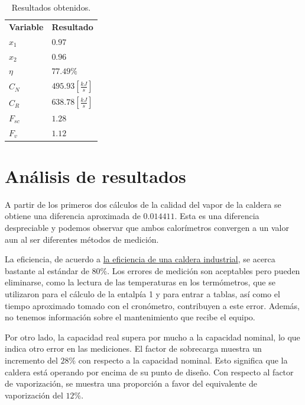 \documentclass[12pt,letterpaper]{article}
\begin{document}
\begin{table}[H] \label{tab:results}
\centering
\renewcommand{\arraystretch}{1.4}
    \begin{tabular}{|l|l|}
    \hline
    \textbf{Variable} & \textbf{Resultado} \\
    $x_1$ & $0.97$ \\
    \hline
    $x_2$ & $0.96$ \\
    \hline
    $\eta$ & $77.49\%$ \\
    \hline
    $C_N$ & $495.93\left[\frac{kJ}{s}\right]$ \\
    \hline
    $C_R$ & $638.78\left[\frac{kJ}{s}\right]$ \\
    \hline
    $F_{sc}$ & $1.28$ \\
    \hline
    $F_{v}$ & $1.12$ \\
    \hline
    \end{tabular}
\caption{Resultados obtenidos.}
\end{table}

\section{Análisis de resultados}

A partir de los primeros dos cálculos de la calidad del vapor de la caldera se obtiene
una diferencia aproximada de $0.014411$. Esta es una diferencia despreciable y podemos observar que ambos
calorímetros convergen a un valor aun al ser diferentes métodos de medición.\linebreak

La eficiencia, de acuerdo a 
\href{https://coalbiomassboiler.com/industrial-steam-boiler-efficiency/}{la eficiencia de una caldera industrial},
se acerca bastante al estándar de $80\%$. 
Los errores de medición son aceptables pero pueden eliminarse, como la lectura de las temperaturas
en los termómetros, que se utilizaron para el cálculo de la entalpía 1 y para entrar a
tablas, así como el tiempo aproximado tomado con el cronómetro, contribuyen a este error. 
Además, no tenemos información sobre el mantenimiento que recibe el equipo.\linebreak

Por otro lado, la capacidad real supera por mucho a la capacidad nominal, 
lo que indica otro error en las mediciones. El factor de sobrecarga muestra un incremento del
$28\%$ con respecto a la capacidad nominal. Esto significa que la 
caldera está operando por encima de su punto de diseño. Con respecto al factor de vaporización, 
se muestra una proporción
a favor del equivalente de vaporización del $12\%$.
\end{document}
